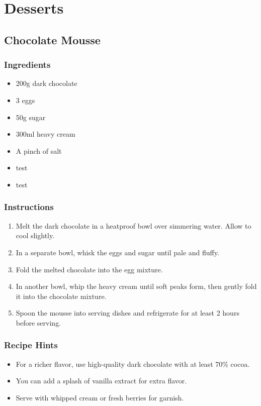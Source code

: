 \chapter{Desserts}

\section{Chocolate Mousse}
\subsection*{Ingredients}
\begin{itemize}
    \item 200g dark chocolate
    \item 3 eggs
    \item 50g sugar
    \item 300ml heavy cream
    \item A pinch of salt
    \item test
    \item test
\end{itemize}

\subsection*{Instructions}
\begin{enumerate}
    \item Melt the dark chocolate in a heatproof bowl over simmering water. Allow to cool slightly.
    \item In a separate bowl, whisk the eggs and sugar until pale and fluffy.
    \item Fold the melted chocolate into the egg mixture.
    \item In another bowl, whip the heavy cream until soft peaks form, then gently fold it into the chocolate mixture.
    \item Spoon the mousse into serving dishes and refrigerate for at least 2 hours before serving.
\end{enumerate}

\subsection*{Recipe Hints}
\begin{itemize}
    \item For a richer flavor, use high-quality dark chocolate with at least 70\% cocoa.
    \item You can add a splash of vanilla extract for extra flavor.
    \item Serve with whipped cream or fresh berries for garnish.
\end{itemize}